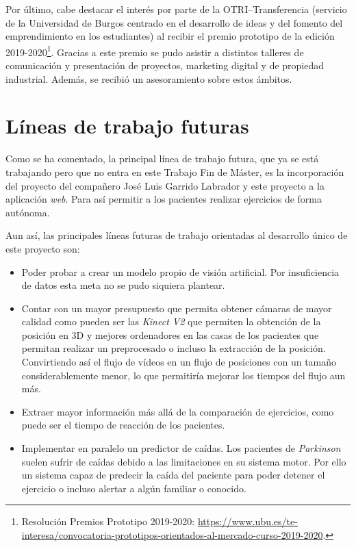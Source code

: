 Por último, cabe destacar el interés por parte de la OTRI--Transferencia (servicio de la Universidad de Burgos centrado en el desarrollo de ideas y del fomento del emprendimiento en los estudiantes) al recibir el premio prototipo de la edición 2019-2020\footnote{Resolución Premios Prototipo 2019-2020: \href{https://www.ubu.es/te-interesa/convocatoria-prototipos-orientados-al-mercado-curso-2019-2020}{https://www.ubu.es/te-interesa/convocatoria-prototipos-orientados-al-mercado-curso-2019-2020}.}. Gracias a este premio se pudo asistir a distintos talleres de comunicación y presentación de proyectos, marketing digital y de propiedad industrial. Además, se recibió un asesoramiento sobre estos ámbitos.

\section{Líneas de trabajo futuras}
Como se ha comentado, la principal línea de trabajo futura, que ya se está trabajando pero que no entra en este Trabajo Fin de Máster, es la incorporación del proyecto del compañero José Luis Garrido Labrador y este proyecto a la aplicación \textit{web}. Para así permitir a los pacientes realizar ejercicios de forma autónoma.

Aun así, las principales líneas futuras de trabajo orientadas al desarrollo único de este proyecto son:
\begin{itemize}
	\item Poder probar a crear un modelo propio de visión artificial. Por insuficiencia de datos esta meta no se pudo siquiera plantear.
	\item Contar con un mayor presupuesto que permita obtener cámaras de mayor calidad como pueden ser las \textit{Kinect V2} que permiten la obtención de la posición en 3D y mejores ordenadores en las casas de los pacientes que permitan realizar un preprocesado o incluso la extracción de la posición. Convirtiendo así el flujo de vídeos en un flujo de posiciones con un tamaño considerablemente menor, lo que permitiría mejorar los tiempos del flujo aun más.
	\item Extraer mayor información más allá de la comparación de ejercicios, como puede ser el tiempo de reacción de los pacientes.
	\item Implementar en paralelo un predictor de caídas. Los pacientes de \textit{Parkinson} suelen sufrir de caídas debido a las limitaciones en su sistema motor. Por ello un sistema capaz de predecir la caída del paciente para poder detener el ejercicio o incluso alertar a algún familiar o conocido.
\end{itemize}

